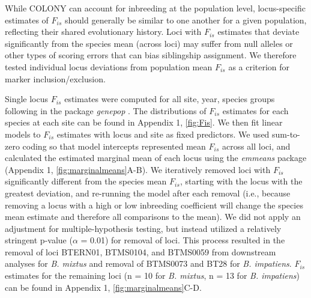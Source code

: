 \documentclass[12pt]{article}
\begin{document}
While COLONY can account for inbreeding at the population level, locus-specific estimates of $F_{is}$ should generally be similar to one another for a given population, reflecting their shared evolutionary history. Loci with $F_{is}$ estimates that deviate significantly from the species mean (across loci) may suffer from null alleles or other types of scoring errors that can bias siblingship assignment. We therefore tested individual locus deviations from population mean $F_{is}$ as a criterion for marker inclusion/exclusion.

Single locus $F_{is}$ estimates were computed for all site, year, species groups following \parencite{weirEstimatingFStatisticsAnalysis1984} in the package \emph{genepop} \parencite{roussetGenepop007CompleteReimplementation2008}. The distributions of $F_{is}$ estimates for each species at each site can be found in Appendix 1, \ref{fig:Fis}. We then fit linear models to $F_{is}$ estimates with locus and site as fixed predictors. We used sum-to-zero coding so that model intercepts represented mean $F_{is}$ across all loci, and calculated the estimated marginal mean of each locus using the \emph{emmeans} package \parencite{lenthEmmeansEstimatedMarginal2024} (Appendix 1, \ref{fig:marginalmeans}A-B). We iteratively removed loci with $F_{is}$ significantly different from the species mean $F_{is}$, starting with the locus with the greatest deviation, and re-running the model after each removal (i.e., because removing a locus with a high or low inbreeding coefficient will change the species mean estimate and therefore all comparisons to the mean). We did not apply an adjustment for multiple-hypothesis testing, but instead utilized a relatively stringent p-value ($\alpha$ = 0.01) for removal of loci. This process resulted in the removal of loci BTERN01, BTMS0104, and BTMS0059 from downstream analyses for \emph{B. mixtus} and removal of BTMS0073 and BT28 for \emph{B. impatiens}. $F_{is}$ estimates for the remaining loci (n = 10 for \emph{B. mixtus}, n = 13 for \emph{B. impatiens}) can be found in Appendix 1, \ref{fig:marginalmeans}C-D.
\end{document}
